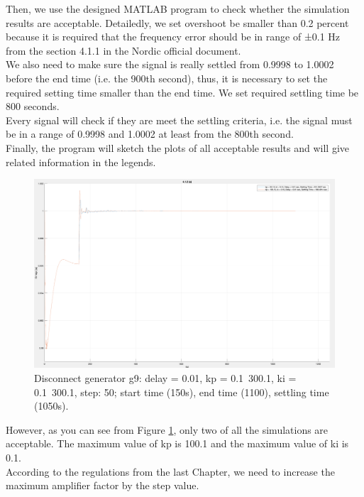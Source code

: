 \documentclass{report}
\begin{document}
Then, we use the designed MATLAB program to check whether the simulation results are acceptable. Detailedly, we set overshoot be smaller than 0.2 percent because it is required that the frequency error should be in range of ±0.1 Hz from the section 4.1.1 in the Nordic official document.\\

We also need to make sure the signal is really settled from 0.9998 to 1.0002 before the end time (i.e. the 900th second), thus, it is necessary to set the required setting time smaller than the end time. We set required settling time be 800 seconds. \\

Every signal will check if they are meet the settling criteria, i.e. the signal must be in a range of 0.9998 and 1.0002 at least from the 800th second.\\

Finally, the program will sketch the plots of all acceptable results and will give related information in the legends. \\

\begin{figure}[htbp]
\centering
\includegraphics[width = .819\textwidth]{figure/4_1_2_a.png}
\caption{Disconnect generator g9: delay = 0.01, kp = 0.1~300.1, ki = 0.1~300.1, step: 50; start time (150s), end time (1100), settling time (1050s).}
\label{4_1_2_a}
\end{figure}

However, as you can see from Figure \textcolor{red}{\ref{4_1_2_a}}, only two of all the simulations are acceptable. The maximum value of kp is 100.1 and the maximum value of ki is 0.1. \\

According to the regulations from the last Chapter, we need to increase the maximum amplifier factor by the step value. \\
\end{document}
